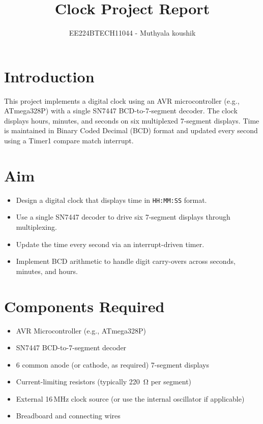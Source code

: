\documentclass{article}
\theoremstyle{remark}
\begin{document}

\vspace{3cm}

\title{Clock Project Report}
\author{EE224BTECH11044 - Muthyala koushik%
}
\date{}
\maketitle
\bigskip



\renewcommand{\thefigure}{\theenumi}
\renewcommand{\thetable}{\theenumi}



\section{Introduction}
This project implements a digital clock using an AVR microcontroller (e.g., ATmega328P) with a single SN7447 BCD-to-7-segment decoder. The clock displays hours, minutes, and seconds on six multiplexed 7-segment displays. Time is maintained in Binary Coded Decimal (BCD) format and updated every second using a Timer1 compare match interrupt.

\section{Aim}
\begin{itemize}[noitemsep]
    \item Design a digital clock that displays time in \texttt{HH:MM:SS} format.
    \item Use a single SN7447 decoder to drive six 7-segment displays through multiplexing.
    \item Update the time every second via an interrupt-driven timer.
    \item Implement BCD arithmetic to handle digit carry-overs across seconds, minutes, and hours.
\end{itemize}

\section{Components Required}
\begin{itemize}[noitemsep]
    \item AVR Microcontroller (e.g., ATmega328P)
    \item SN7447 BCD-to-7-segment decoder
    \item 6 common anode (or cathode, as required) 7-segment displays
    \item Current-limiting resistors (typically \SI{220}{\ohm} per segment)
    \item External 16\,MHz clock source (or use the internal oscillator if applicable)
    \item Breadboard and connecting wires
\end{itemize}
\end{document}

